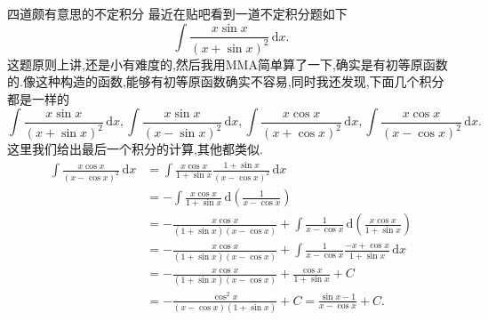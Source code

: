 \documentclass[UTF8,no-math,12pt,openany,table,dvipsnames,svgnames]{book}
\begin{document}
\begin{MYBOX}[colbacktitle=blue]{四道颇有意思的不定积分}\setlength{\parindent}{2em}
最近在贴吧看到一道不定积分题如下
\[\int\frac{x\sin x}{(x+\sin x)^2}\,\mathrm dx.\]
这题原则上讲,还是小有难度的,然后我用MMA简单算了一下,确实是有初等原函数的.像这种构造的函数,能够有初等原函数确实不容易,同时我还发现,下面几个积分都是一样的
\[\int\frac{x\sin x}{(x+\sin x)^2}\,\mathrm dx,\int\frac{x\sin x}{(x-\sin x)^2}\,\mathrm dx,\int\frac{x\cos x}{(x+\cos x)^2}\,\mathrm dx,\int\frac{x\cos x}{(x-\cos x)^2}\,\mathrm dx.\]
这里我们给出最后一个积分的计算,其他都类似.
\begin{align*}
\int\frac{x\cos x}{(x-\cos x)^2}\,\mathrm dx&=\int{\frac{x\cos x}{1+\sin x}\frac{1+\sin x}{\left( x-\cos x \right) ^2}\,\mathrm{d}x}\\
&=-\int{\frac{x\cos x}{1+\sin x}\,\text{d}\left( \frac{1}{x-\cos x} \right)}\\
&=-\frac{x\cos x}{\left( 1+\sin x \right) \left( x-\cos x \right)}+\int{\frac{1}{x-\cos x}\,\text{d}\left( \frac{x\cos x}{1+\sin x} \right)}\\
&=-\frac{x\cos x}{\left( 1+\sin x \right) \left( x-\cos x \right)}+\int{\frac{1}{x-\cos x}\frac{-x+\cos x}{1+\sin x}\,\text{d}x}\\
&=-\frac{x\cos x}{\left( 1+\sin x \right) \left( x-\cos x \right)}+\frac{\cos x}{1+\sin x}+C\\
&=-\frac{\cos ^2x}{\left( x-\cos x \right) \left( 1+\sin x \right)}+C=\frac{\sin x-1}{x-\cos x}+C.
\end{align*}
\end{MYBOX}
\end{document}
